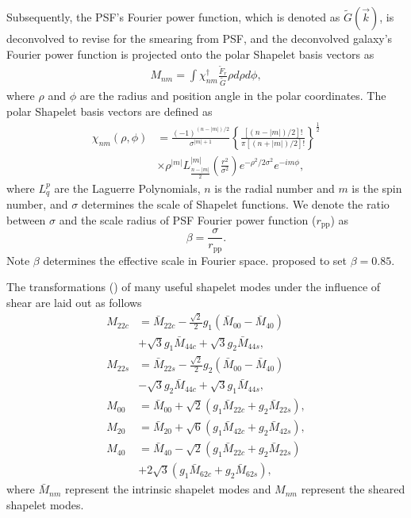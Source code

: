 Subsequently, the PSF's Fourier power function, which is denoted as
$\tilde{G}(\vec{k})$, is deconvolved to revise for the smearing from PSF,
and the deconvolved galaxy's Fourier power function is projected onto the
polar Shapelet basis vectors \citep{polar_Shapelets} as
\begin{align}\label{Shapelets_decompose}
M_{nm}=\int \chi_{nm}^\dagger \frac{\tilde{F}_r}{\tilde{G}}\rho d\rho d\phi,
\end{align}
where $\rho$ and $\phi$ are the radius and position angle in the polar
coordinates.
The polar Shapelet basis vectors are defined as
\begin{align*}
\chi_{nm}(\rho,\phi)&=\frac{(-1)^{(n-|m|)/2}}{\sigma^{|m|+1}}\left\lbrace
    \frac{[(n-|m|)/2]!}{\pi[(n+|m|)/2]!}\right\rbrace^\frac{1}{2}\\
    &\times
    \rho^{|m|}L^{|m|}_{\frac{n-|m|}{2}}\left(\frac{r^2}{\sigma^2}\right)e^{-\rho^2/2\sigma^2}
    e^{-im\phi},
\end{align*}
where $L^{p}_{q}$ are the Laguerre Polynomials, $n$ is the radial number and
$m$ is the spin number, and $\sigma$ determines the scale of Shapelet
functions. We denote the ratio between $\sigma$ and the scale radius of PSF
Fourier power function ($r_{\text{pp}}$) as \citep{FPFS-Li2018}
\begin{equation}
\beta=\frac{\sigma}{r_{\text{pp}}}.
\end{equation}
Note $\beta$ determines the effective scale in Fourier space.
\citet{FPFS-Li2018} proposed to set $\beta=0.85$.

The transformations (\citep{polar_Shapelets}) of many useful shapelet modes under the influence of shear are laid out as follows
\begin{equation}\label{Shapelets_Moments_shear_Transform}
\begin{split}
M_{22c}&=\bar{M}_{22c}-\frac{\sqrt{2}}{2}g_1(\bar{M}_{00}-\bar{M}_{40})\\
&+\sqrt{3}g_1 \bar{M}_{44c}+\sqrt{3} g_2 \bar{M}_{44s},\\
M_{22s}&=\bar{M}_{22s}-\frac{\sqrt{2}}{2}g_2(\bar{M}_{00}-\bar{M}_{40})\\
&-\sqrt{3}g_2 \bar{M}_{44c}+\sqrt{3} g_1 \bar{M}_{44s},\\
M_{00} &=\bar{M}_{00}+\sqrt{2}(g_1\bar{M}_{22c}+g_2\bar{M}_{22s}),\\
M_{20} &=\bar{M}_{20}+\sqrt{6}(g_1\bar{M}_{42c}+g_2\bar{M}_{42s}),\\
M_{40} &=\bar{M}_{40}-\sqrt{2}(g_1\bar{M}_{22c}+g_2\bar{M}_{22s})\\
&+2\sqrt{3}(g_1\bar{M}_{62c}+g_2\bar{M}_{62s}),
\end{split}
\end{equation}
where $\bar{M}_{nm}$ represent the intrinsic shapelet modes and $M_{nm}$
represent the sheared shapelet modes.

